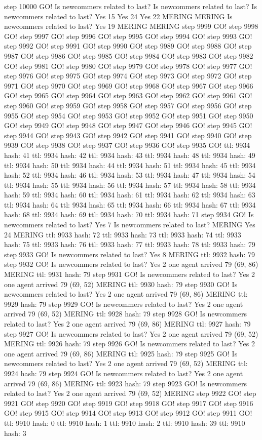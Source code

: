 step 10000 GO! Is newcommers related to last? Is newcommers related to last? Is newcommers related to last? Yes 15 Yes 24 Yes 22 MERING MERING Is newcommers related to last? Yes 19 MERING MERING step 9999 GO! step 9998 GO! step 9997 GO! step 9996 GO! step 9995 GO! step 9994 GO! step 9993 GO! step 9992 GO! step 9991 GO! step 9990 GO! step 9989 GO! step 9988 GO! step 9987 GO! step 9986 GO! step 9985 GO! step 9984 GO! step 9983 GO! step 9982 GO! step 9981 GO! step 9980 GO! step 9979 GO! step 9978 GO! step 9977 GO! step 9976 GO! step 9975 GO! step 9974 GO! step 9973 GO! step 9972 GO! step 9971 GO! step 9970 GO! step 9969 GO! step 9968 GO! step 9967 GO! step 9966 GO! step 9965 GO! step 9964 GO! step 9963 GO! step 9962 GO! step 9961 GO! step 9960 GO! step 9959 GO! step 9958 GO! step 9957 GO! step 9956 GO! step 9955 GO! step 9954 GO! step 9953 GO! step 9952 GO! step 9951 GO! step 9950 GO! step 9949 GO! step 9948 GO! step 9947 GO! step 9946 GO! step 9945 GO! step 9944 GO! step 9943 GO! step 9942 GO! step 9941 GO! step 9940 GO! step 9939 GO! step 9938 GO! step 9937 GO! step 9936 GO! step 9935 GO! ttl: 9934 hash: 41 ttl: 9934 hash: 42 ttl: 9934 hash: 43 ttl: 9934 hash: 48 ttl: 9934 hash: 49 ttl: 9934 hash: 50 ttl: 9934 hash: 44 ttl: 9934 hash: 51 ttl: 9934 hash: 45 ttl: 9934 hash: 52 ttl: 9934 hash: 46 ttl: 9934 hash: 53 ttl: 9934 hash: 47 ttl: 9934 hash: 54 ttl: 9934 hash: 55 ttl: 9934 hash: 56 ttl: 9934 hash: 57 ttl: 9934 hash: 58 ttl: 9934 hash: 59 ttl: 9934 hash: 60 ttl: 9934 hash: 61 ttl: 9934 hash: 62 ttl: 9934 hash: 63 ttl: 9934 hash: 64 ttl: 9934 hash: 65 ttl: 9934 hash: 66 ttl: 9934 hash: 67 ttl: 9934 hash: 68 ttl: 9934 hash: 69 ttl: 9934 hash: 70 ttl: 9934 hash: 71 step 9934 GO! Is newcommers related to last? Yes 7 Is newcommers related to last? MERING Yes 24 MERING ttl: 9933 hash: 72 ttl: 9933 hash: 73 ttl: 9933 hash: 74 ttl: 9933 hash: 75 ttl: 9933 hash: 76 ttl: 9933 hash: 77 ttl: 9933 hash: 78 ttl: 9933 hash: 79 step 9933 GO! Is newcommers related to last? Yes 8 MERING ttl: 9932 hash: 79 step 9932 GO! Is newcommers related to last? Yes 2 one agent arrived 79 (69, 86) MERING ttl: 9931 hash: 79 step 9931 GO! Is newcommers related to last? Yes 2 one agent arrived 79 (69, 52) MERING ttl: 9930 hash: 79 step 9930 GO! Is newcommers related to last? Yes 2 one agent arrived 79 (69, 86) MERING ttl: 9929 hash: 79 step 9929 GO! Is newcommers related to last? Yes 2 one agent arrived 79 (69, 52) MERING ttl: 9928 hash: 79 step 9928 GO! Is newcommers related to last? Yes 2 one agent arrived 79 (69, 86) MERING ttl: 9927 hash: 79 step 9927 GO! Is newcommers related to last? Yes 2 one agent arrived 79 (69, 52) MERING ttl: 9926 hash: 79 step 9926 GO! Is newcommers related to last? Yes 2 one agent arrived 79 (69, 86) MERING ttl: 9925 hash: 79 step 9925 GO! Is newcommers related to last? Yes 2 one agent arrived 79 (69, 52) MERING ttl: 9924 hash: 79 step 9924 GO! Is newcommers related to last? Yes 2 one agent arrived 79 (69, 86) MERING ttl: 9923 hash: 79 step 9923 GO! Is newcommers related to last? Yes 2 one agent arrived 79 (69, 52) MERING step 9922 GO! step 9921 GO! step 9920 GO! step 9919 GO! step 9918 GO! step 9917 GO! step 9916 GO! step 9915 GO! step 9914 GO! step 9913 GO! step 9912 GO! step 9911 GO! ttl: 9910 hash: 0 ttl: 9910 hash: 1 ttl: 9910 hash: 2 ttl: 9910 hash: 39 ttl: 9910 hash: 3 